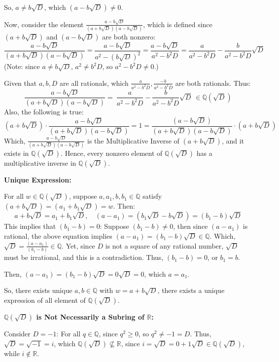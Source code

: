\documentclass{article}
\begin{document}
So, $a\neq b\sqrt{D}$, which $(a-b\sqrt{D})\neq 0$.

\hfill

Now, consider the element $\frac{a-b\sqrt{D}}{(a+b\sqrt{D})(a-b\sqrt{D})}$, which is defined since $(a+b\sqrt{D})$ and $(a-b\sqrt{D})$ are both nonzero:
$$\frac{a-b\sqrt{D}}{(a+b\sqrt{D})(a-b\sqrt{D})}=\frac{a-b\sqrt{D}}{a^2-(b\sqrt{D})^2} = \frac{a-b\sqrt{D}}{a^2-b^2D} = \frac{a}{a^2-b^2D}-\frac{b}{a^2-b^2D}\sqrt{D}$$
(Note: since $a\neq b\sqrt{D}$, $a^2\neq b^2D$, so $a^2-b^2D \neq 0$.)

Given that $a,b,D$ are all rationals, which $\frac{a}{a^2-b^2D}, \frac{-b}{a^2-b^2D}$ are both rationals. Thus:
$$\frac{a-b\sqrt{D}}{(a+b\sqrt{D})(a-b\sqrt{D})}=\ \frac{a}{a^2-b^2D}-\frac{b}{a^2-b^2D}\sqrt{D}\ \in \mathbb{Q}(\sqrt{D})$$
Also, the following is true:
$$(a+b\sqrt{D})\cdot \frac{a-b\sqrt{D}}{(a+b\sqrt{D})(a-b\sqrt{D})} = 1 = \frac{(a-b\sqrt{D})}{(a+b\sqrt{D})(a-b\sqrt{D})}\cdot (a+b\sqrt{D})$$
Which, $\frac{a-b\sqrt{D}}{(a+b\sqrt{D})(a-b\sqrt{D})}$ is the Multiplicative Inverse of $(a+b\sqrt{D})$, and it exists in $\mathbb{Q}(\sqrt{D})$.
Hence, every nonzero element of $\mathbb{Q}(\sqrt{D})$ has a multiplicative inverse in $\mathbb{Q}(\sqrt{D})$.

\hfill

\textbf{Unique Expression:}

For all $w\in\mathbb{Q}(\sqrt{D})$, suppose $a,a_1,b,b_1\in\mathbb{Q}$ satisfy $(a+b\sqrt{D})=(a_1+b_1\sqrt{D})=w$. Then:
$$a+b\sqrt{D}=a_1+b_1\sqrt{D},\quad (a-a_1)=(b_1\sqrt{D}-b\sqrt{D}) = (b_1-b)\sqrt{D}$$
This implies that $(b_1-b)=0$: Suppose $(b_1-b)\neq 0$, then since $(a-a_1)$ is rational, the above equation implies $(a-a_1)=(b_1-b)\sqrt{D}\in\mathbb{Q}$.
Which, $\sqrt{D}=\frac{(a-a_1)}{(b_1-b)}\in\mathbb{Q}$. Yet, since $D$ is not a square of any rational number, $\sqrt{D}$ must be irrational, 
and this is a contradiction. Thus, $(b_1-b)=0$, or $b_1=b$.

Then, $(a-a_1)=(b_1-b)\sqrt{D} = 0\sqrt{D} = 0$, which $a=a_1$.

So, there exists unique $a,b\in\mathbb{Q}$ with $w=a+b\sqrt{D}$, there exists a unique expression of all element of $\mathbb{Q}(\sqrt{D})$.

\hfill

\textbf{$\mathbb{Q}(\sqrt{D})$ is Not Necessarily a Subring of $\mathbb{R}$:}

Consider $D=-1$: For all $q\in\mathbb{Q}$, since $q^2 \geq 0$, so $q^2\neq -1=D$. Thus, $\sqrt{D}=\sqrt{-1}=i$, which $\mathbb{Q}(\sqrt{D}) \not\subseteq \mathbb{R}$,
since $i = \sqrt{D} = 0+1\sqrt{D} \in \mathbb{Q}(\sqrt{D})$, while $i\notin \mathbb{R}$.
\end{document}
